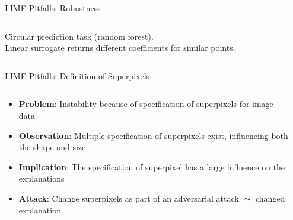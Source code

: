 \documentclass[11pt,compress,t,notes=noshow, aspectratio=169, xcolor=table]{beamer}
\begin{document}
\begin{vbframe}[c]{LIME Pitfalls: Robustness }
\begin{columns}
\begin{column}{0.48\textwidth}
\begin{center}
	{Circular prediction task (random forest). \\Linear surrogate returns different coefficients for similar points.}
	
	\end{center}
\end{column}
\end{columns}
\end{vbframe}

\begin{vbframe}{LIME Pitfalls: Definition of Superpixels}

\begin{columns}
    
    \begin{column}{0.6\textwidth}
        
        \begin{itemize}
        	\item \textbf{Problem}: Instability because of specification of superpixels for image data 
        	\item \textbf{Observation}: Multiple specification of superpixels exist, influencing both the shape and size 
        	\item \textbf{Implication}: The specification of superpixel has a large influence on the explanations 
        	\item \textbf{Attack}: Change superpixels as part of an adversarial attack $\leadsto$ changed explanation
        \end{itemize}
        
    \end{column}
    
    \begin{column}{0.4\textwidth}
    

\end{column}
\end{columns}
\end{vbframe}
\end{document}
